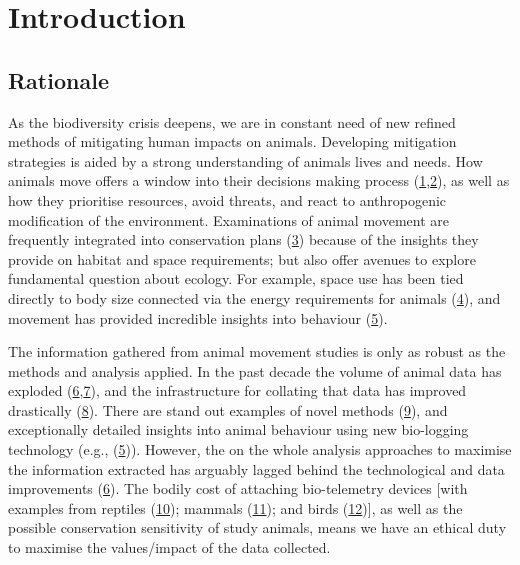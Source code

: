 \documentclass[10pt,a4paper]{article}
\begin{document}
\clearpage
\pagestyle{fancy}

\hypertarget{main}{%
\section{Introduction}\label{main}}

\hypertarget{rationale}{%
\subsection{Rationale}\label{rationale}}

As the biodiversity crisis deepens, we are in constant need of new refined methods of mitigating human impacts on animals.
Developing mitigation strategies is aided by a strong understanding of animals lives and needs.
How animals move offers a window into their decisions making process (\protect\hyperlink{ref-Bastille-Rousseau2017}{1},\protect\hyperlink{ref-sridhar_geometry_2021}{2}), as well as how they prioritise resources, avoid threats, and react to anthropogenic modification of the environment.
Examinations of animal movement are frequently integrated into conservation plans (\protect\hyperlink{ref-Fraser2018}{3}) because of the insights they provide on habitat and space requirements; but also offer avenues to explore fundamental question about ecology.
For example, space use has been tied directly to body size connected via the energy requirements for animals (\protect\hyperlink{ref-noonan_effects_2020}{4}), and movement has provided incredible insights into behaviour (\protect\hyperlink{ref-studd_purrfect_2021}{5}).

The information gathered from animal movement studies is only as robust as the methods and analysis applied.
In the past decade the volume of animal data has exploded (\protect\hyperlink{ref-joo_recent_2022}{6},\protect\hyperlink{ref-wild_internet_2022}{7}), and the infrastructure for collating that data has improved drastically (\protect\hyperlink{ref-kays_movebank_2022}{8}).
There are stand out examples of novel methods (\protect\hyperlink{ref-saunders_radio-tracking_2022}{9}), and exceptionally detailed insights into animal behaviour using new bio-logging technology (e.g., (\protect\hyperlink{ref-studd_purrfect_2021}{5})).
However, the on the whole analysis approaches to maximise the information extracted has arguably lagged behind the technological and data improvements (\protect\hyperlink{ref-joo_recent_2022}{6}).
The bodily cost of attaching bio-telemetry devices {[}with examples from reptiles (\protect\hyperlink{ref-Weatherhead2004}{10}); mammals (\protect\hyperlink{ref-robstad_impact_2021}{11}); and birds (\protect\hyperlink{ref-portugal_externally_2022}{12}){]}, as well as the possible conservation sensitivity of study animals, means we have an ethical duty to maximise the values/impact of the data collected.
\end{document}
